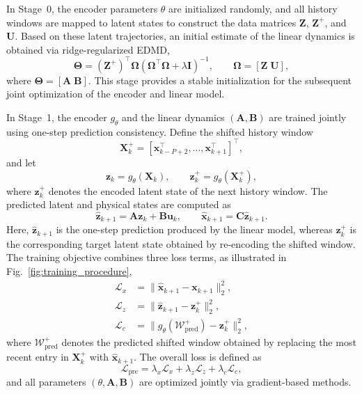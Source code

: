 \documentclass[journal]{IEEEtran}
\newcommand{\vx}{\mathbf{x}}
\newcommand{\vu}{\mathbf{u}}
\newcommand{\vz}{\mathbf{z}}
\newcommand{\mA}{\mathbf{A}}
\newcommand{\mB}{\mathbf{B}}
\newcommand{\mC}{\mathbf{C}}
\newcommand{\mX}{\mathbf{X}}
\newcommand{\mZ}{\mathbf{Z}}
\newcommand{\mU}{\mathbf{U}}
\newcommand{\mI}{\mathbf{I}}
\newcommand{\mTheta}{\boldsymbol{\Theta}}
\newcommand{\mOmega}{\boldsymbol{\Omega}}
\begin{document}
In Stage~0, the encoder parameters $\theta$ are initialized randomly, and all history windows are mapped to latent states to construct the data matrices $\mZ$, $\mZ^{+}$, and $\mU$. Based on these latent trajectories, an initial estimate of the linear dynamics is obtained via ridge-regularized EDMD,
\begin{equation}
    \mTheta = (\mZ^{+})^\top \mOmega \left(\mOmega^\top \mOmega + \lambda \mI\right)^{-1},
    \qquad
    \mOmega = [\mZ\;\mU],
    \label{eq:edmd_solution}
\end{equation}
where $\mTheta = [\mA\;\mB]$. This stage provides a stable initialization for the subsequent joint optimization of the encoder and linear model.

In Stage~1, the encoder $g_\theta$ and the linear dynamics $(\mA,\mB)$ are trained jointly using one-step prediction consistency. Define the shifted history window
\begin{equation}
    \mX_k^{+} = [\vx_{k-P+2}^\top,\ldots,\vx_{k+1}^\top]^\top,
\end{equation}
and let
\begin{equation}
    \vz_k = g_\theta(\mX_k), \qquad
    \vz_k^{+} = g_\theta(\mX_k^{+}),
\end{equation}
where $\vz_k^{+}$ denotes the encoded latent state of the next history window. The predicted latent and physical states are computed as
\begin{equation}
    \hat{\vz}_{k+1} = \mA \vz_k + \mB \vu_k,
    \qquad
    \hat{\vx}_{k+1} = \mC \hat{\vz}_{k+1}.
\end{equation}
Here, $\hat{\vz}_{k+1}$ is the one-step prediction produced by the linear model, whereas $\vz_k^{+}$ is the corresponding target latent state obtained by re-encoding the shifted window. The training objective combines three loss terms, as illustrated in Fig.~\ref{fig:training_procedure},
\begin{align}
    \mathcal{L}_{x} &= \|\hat{\vx}_{k+1}-\vx_{k+1}\|_2^2, \label{eq:loss_x}\\
    \mathcal{L}_{z} &= \|\hat{\vz}_{k+1}-\vz_k^{+}\|_2^2, \label{eq:loss_z}\\
    \mathcal{L}_{c} &= \bigl\|g_\theta(\mathcal{W}^{+}_{\mathrm{pred}})-\vz_k^{+}\bigr\|_2^2, \label{eq:loss_c}
\end{align}
where $\mathcal{W}^{+}_{\mathrm{pred}}$ denotes the predicted shifted window obtained by replacing the most recent entry in $\mX_k^{+}$ with $\hat{\vx}_{k+1}$. The overall loss is defined as
\begin{equation}
    \mathcal{L}_{\mathrm{pre}} = \lambda_x \mathcal{L}_x + \lambda_z \mathcal{L}_z + \lambda_c \mathcal{L}_c,
    \label{eq:pretraining_loss}
\end{equation}
and all parameters $(\theta, \mA, \mB)$ are optimized jointly via gradient-based methods.
\end{document}
